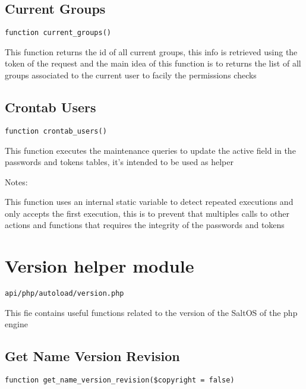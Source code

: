 \documentclass[a4paper]{book}
\begin{document}
\hypertarget{toc309}{}
\subsection{Current Groups}

\begin{lstlisting}
function current_groups()
\end{lstlisting}

This function returns the id of all current groups, this info is retrieved
using the token of the request and the main idea of this function is to
returns the list of all groups associated to the current user to facily the
permissions checks

\hypertarget{toc310}{}
\subsection{Crontab Users}

\begin{lstlisting}
function crontab_users()
\end{lstlisting}

This function executes the maintenance queries to update the active field
in the passwords and tokens tables, it's intended to be used as helper

Notes:

This function uses an internal static variable to detect repeated executions
and only accepts the first execution, this is to prevent that multiples calls
to other actions and functions that requires the integrity of the passwords
and tokens

\hypertarget{toc311}{}
\section{Version helper module}

\begin{lstlisting}
api/php/autoload/version.php
\end{lstlisting}

This fie contains useful functions related to the version of the SaltOS of the php engine

\hypertarget{toc312}{}
\subsection{Get Name Version Revision}

\begin{lstlisting}
function get_name_version_revision($copyright = false)
\end{lstlisting}
\end{document}
